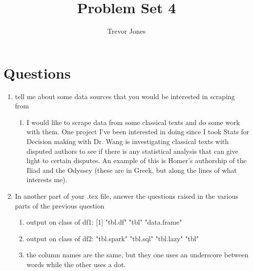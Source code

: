 \documentclass{article}
\title{Problem Set 4}
\author{Trevor Jones}
\begin{document}
\maketitle

\section{Questions}
\begin{enumerate}
    \item tell me about some data sources that you would be interested in scraping from
    \begin{enumerate}
        \item I would like to scrape data from some classical texts and do some work with them. One project I've been interested in doing since I took Stats for Decision making with Dr. Wang is investigating classical texts with disputed authors to see if there is any statistical analysis that can give light to certain disputes. An example of this is Homer's authorship of the Iliad and the Odyssey (these are in Greek, but along the lines of what interests me). 
    \end{enumerate}
    \item In another part of your .tex file, answer the questions raised in the various parts of the previous question
    \begin{enumerate}
        \item output on class of df1: [1] "tbl.df"     "tbl"        "data.frame"
        \item output on class of df2: "tbl.spark" "tbl.sql"   "tbl.lazy"  "tbl" 
        \item the column names are the same, but they one uses an underscore between words while the other uses a dot.
    \end{enumerate}
\end{enumerate}
\end{document}
